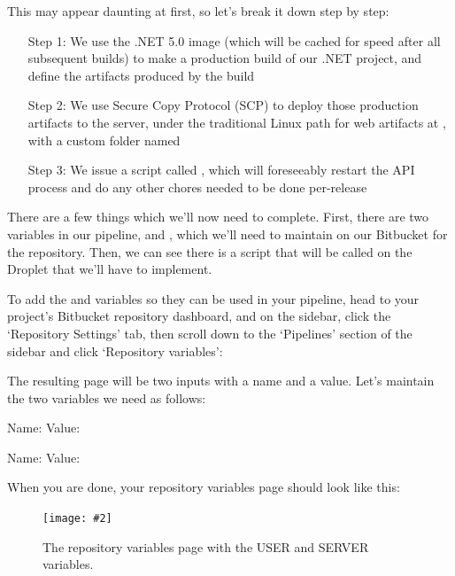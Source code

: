 \documentclass[paper=6in:9in,pagesize=pdftex,headinclude=on,footinclude=on,12pt,twoside]{scrbook}
\newcommand{\standardfigure}[3]{\begin{figure}[H]\begin{center}\texttt{[image: \#2]}\caption{#3}\label{fig:#2}\end{center}\end{figure}}
\begin{document}
This may appear daunting at first, so let's break it down step by step:

\begin{itemize}
  \item [Step 1:] We use the .NET 5.0 image (which will be cached for speed after all subsequent builds) to make a production build of our .NET project, and define the artifacts produced by the build
  \item [Step 2:] We use Secure Copy Protocol (SCP) to deploy those production artifacts to the server, under the traditional Linux path for web artifacts at , with a custom folder named 
  \item [Step 3:] We issue a script called , which will foreseeably restart the API process and do any other chores needed to be done per-release
\end{itemize}

There are a few things which we'll now need to complete. First, there are two variables in our pipeline,  and , which we'll need to maintain on our Bitbucket for the repository. Then, we can see there is a script  that will be called on the Droplet that we'll have to implement.


To add the  and  variables so they can be used in your pipeline, head to your project's Bitbucket repository dashboard, and on the sidebar, click the `Repository Settings' tab, then scroll down to the `Pipelines' section of the sidebar and click `Repository variables':


The resulting page will be two inputs with a name and a value. Let's maintain the two variables we need as follows:

\begin{arrows}
  \item Name:  Value: 
  \item Name:  Value: 
\end{arrows}

When you are done, your repository variables page should look like this:

\standardfigure{\textwidth}{/backend/repository-variables-page}{The repository variables page with the USER and SERVER variables.}
\end{document}
